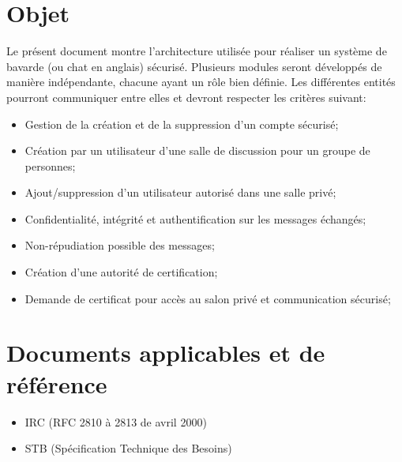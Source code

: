 \documentclass[a4paper,11pt,french]{article}
\begin{document}
\clearpage
\tableofcontents
\clearpage
\section{Objet}
Le présent document montre l'architecture utilisée pour réaliser un système de bavarde (ou chat en anglais) sécurisé. Plusieurs modules seront développés de manière indépendante, chacune ayant un rôle bien définie. Les différentes entités pourront communiquer entre elles et devront respecter les critères suivant:\\
\begin{itemize}
\item Gestion de la création et de la suppression d’un compte sécurisé;
\item Création par un utilisateur d’une salle de discussion pour un groupe de personnes;
\item Ajout/suppression d’un utilisateur autorisé dans une salle privé;
\item Confidentialité, intégrité et authentification sur les messages échangés;
\item Non-répudiation possible des messages;
\item Création d’une autorité de certification;
\item Demande de certificat pour accès au salon privé et communication sécurisé;
\end{itemize}

\section{Documents applicables et de référence}
\begin{itemize}
\item IRC (RFC 2810 à 2813 de avril 2000)
\item STB (Spécification Technique des Besoins)
\end{itemize}

\end{document}
